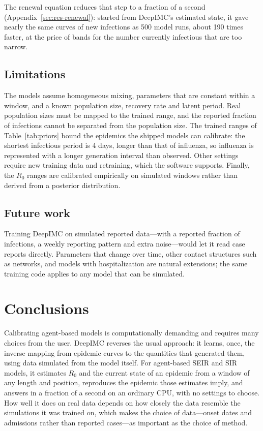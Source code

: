 \documentclass[12pt]{article}
\begin{document}
The renewal equation reduces that step to a fraction of a second (Appendix~\ref{sec:res-renewal}): started from
DeepIMC's estimated state, it
gave nearly the same curves of new infections as 500 model runs, about 190 times faster, at the price of bands for the
number currently infectious that are too narrow.
\subsection{Limitations}

The models assume homogeneous mixing, parameters that are constant within a window, and a known
population size, recovery rate and latent period. Real population sizes must be mapped to the trained
range, and the reported fraction of infections cannot be separated from the population size. The trained
ranges of Table~\ref{tab:priors} bound the epidemics the shipped models can calibrate: the shortest
infectious period is 4 days, longer than that of influenza, so influenza is represented with a longer
generation interval than observed. Other settings require new training data and retraining, which the
software supports. Finally, the $R_0$ ranges are calibrated empirically on simulated windows rather than
derived from a posterior distribution.

\subsection{Future work}

Training DeepIMC on simulated reported data---with a reported fraction of infections, a weekly reporting
pattern and extra noise---would let it read case reports directly. Parameters that change over time,
other contact structures such as networks, and models with hospitalization are natural extensions; the
same training code applies to any model that can be simulated.

\section{Conclusions}

Calibrating agent-based models is computationally demanding and requires many choices from the user.
DeepIMC reverses the usual approach: it learns, once, the inverse mapping from epidemic curves to the
quantities that generated them, using data simulated from the model itself. For agent-based SEIR and SIR
models, it estimates $R_0$ and the current state of an epidemic from a window of any length and position,
reproduces the epidemic those estimates imply, and answers in a fraction of a second on an ordinary CPU,
with no settings to choose. How well it does on real data depends on how closely the data resemble the
simulations it was trained on, which makes the choice of data---onset dates and admissions rather than
reported cases---as important as the choice of method.
\end{document}
